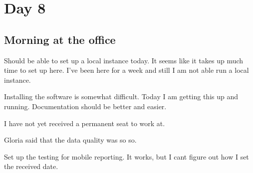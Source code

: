 \section{Day 8}
\subsection{Morning at the office}
Should be able to set up a local instance today.
It seems like it takes up much time to set up here.
I've been here for a week and still I am not able run a local instance.

Installing the software is somewhat difficult. Today I am getting this up and running.
Documentation should be better and easier.

I have not yet received a permanent seat to work at.

Gloria said that the data quality was so so.

Set up the testing for mobile reporting. It works, but I cant figure out how I set the received date.
